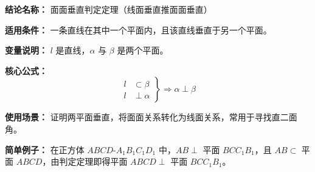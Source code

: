 \textbf{结论名称：} 面面垂直判定定理（线面垂直推面面垂直）

\textbf{适用条件：} 一条直线在其中一个平面内，且该直线垂直于另一个平面。

\textbf{变量说明：} $l$ 是直线，$\alpha$ 与 $\beta$ 是两个平面。

\textbf{核心公式：}
\[
\boxed{
\left.
\begin{aligned}
l &\subset \beta \\
l &\perp \alpha
\end{aligned}
\right\}
\Rightarrow \alpha \perp \beta
}
\]

\textbf{使用场景：} 证明两平面垂直，将面面关系转化为线面关系，常用于寻找直二面角。

\textbf{简单例子：} 在正方体 $ABCD$-$A_1B_1C_1D_1$ 中，$AB \perp$ 平面 $BCC_1B_1$，且 $AB \subset$ 平面 $ABCD$，由判定定理即得平面 $ABCD \perp$ 平面 $BCC_1B_1$。